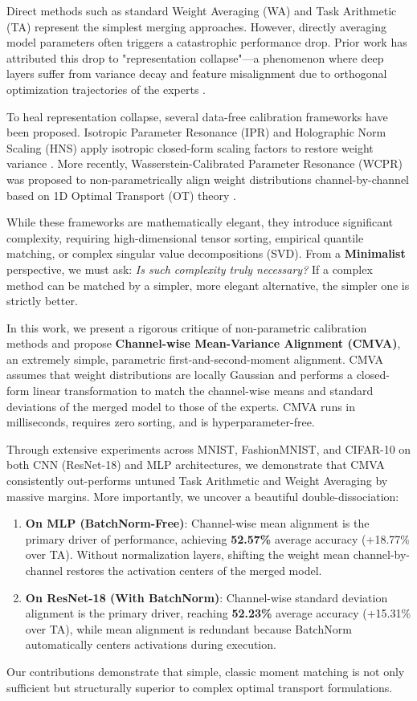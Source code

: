 \documentclass{article}
\theoremstyle{plain}
\theoremstyle{definition}
\theoremstyle{remark}
\begin{document}
Direct methods such as standard Weight Averaging (WA) and Task Arithmetic (TA) represent the simplest merging approaches. However, directly averaging model parameters often triggers a catastrophic performance drop. Prior work has attributed this drop to "representation collapse"—a phenomenon where deep layers suffer from variance decay and feature misalignment due to orthogonal optimization trajectories of the experts \citep{submission9}.

To heal representation collapse, several data-free calibration frameworks have been proposed. Isotropic Parameter Resonance (IPR) and Holographic Norm Scaling (HNS) apply isotropic closed-form scaling factors to restore weight variance \citep{submission5}. More recently, Wasserstein-Calibrated Parameter Resonance (WCPR) was proposed to non-parametrically align weight distributions channel-by-channel based on 1D Optimal Transport (OT) theory \citep{submission9}.

While these frameworks are mathematically elegant, they introduce significant complexity, requiring high-dimensional tensor sorting, empirical quantile matching, or complex singular value decompositions (SVD). From a \textbf{Minimalist} perspective, we must ask: \textit{Is such complexity truly necessary?} If a complex method can be matched by a simpler, more elegant alternative, the simpler one is strictly better.

In this work, we present a rigorous critique of non-parametric calibration methods and propose \textbf{Channel-wise Mean-Variance Alignment (CMVA)}, an extremely simple, parametric first-and-second-moment alignment. CMVA assumes that weight distributions are locally Gaussian and performs a closed-form linear transformation to match the channel-wise means and standard deviations of the merged model to those of the experts. CMVA runs in milliseconds, requires zero sorting, and is hyperparameter-free.

Through extensive experiments across MNIST, FashionMNIST, and CIFAR-10 on both CNN (ResNet-18) and MLP architectures, we demonstrate that CMVA consistently out-performs untuned Task Arithmetic and Weight Averaging by massive margins. More importantly, we uncover a beautiful double-dissociation:
\begin{enumerate}
  \item \textbf{On MLP (BatchNorm-Free)}: Channel-wise mean alignment is the primary driver of performance, achieving \textbf{52.57\%} average accuracy (+18.77\% over TA). Without normalization layers, shifting the weight mean channel-by-channel restores the activation centers of the merged model.
  \item \textbf{On ResNet-18 (With BatchNorm)}: Channel-wise standard deviation alignment is the primary driver, reaching \textbf{52.23\%} average accuracy (+15.31\% over TA), while mean alignment is redundant because BatchNorm automatically centers activations during execution.
\end{enumerate}
Our contributions demonstrate that simple, classic moment matching is not only sufficient but structurally superior to complex optimal transport formulations.
\end{document}
